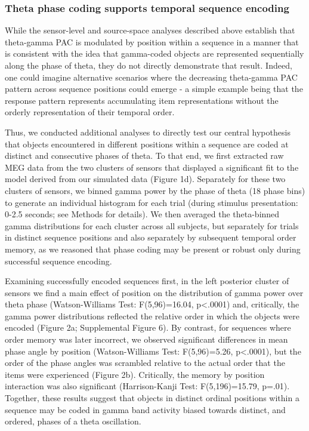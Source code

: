 \subsubsection{Theta phase coding supports temporal sequence
encoding}\label{theta-phase-coding-supports-temporal-sequence-encoding}

While the sensor-level and source-space analyses described above
establish that theta-gamma PAC is modulated by position within a
sequence in a manner that is consistent with the idea that gamma-coded
objects are represented sequentially along the phase of theta, they do
not directly demonstrate that result. Indeed, one could imagine
alternative scenarios where the decreasing theta-gamma PAC pattern
across sequence positions could emerge - a simple example being that the
response pattern represents accumulating item representations without
the orderly representation of their temporal order.

Thus, we conducted additional analyses to directly test our central
hypothesis that objects encountered in different positions within a
sequence are coded at distinct and consecutive phases of theta. To that
end, we first extracted raw MEG data from the two clusters of sensors
that displayed a significant fit to the model derived from our simulated
data (Figure 1d). Separately for these two clusters of sensors, we
binned gamma power by the phase of theta (18 phase bins) to generate an
individual histogram for each trial (during stimulus presentation: 0-2.5
seconds; see Methods for details). We then averaged the theta-binned
gamma distributions for each cluster across all subjects, but separately
for trials in distinct sequence positions and also separately by
subsequent temporal order memory, as we reasoned that phase coding may
be present or robust only during successful sequence encoding.

Examining successfully encoded sequences first, in the left posterior
cluster of sensors we find a main effect of position on the distribution
of gamma power over theta phase (Watson-Williams Test: F(5,96)=16.04,
p\textless{}.0001) and, critically, the gamma power distributions
reflected the relative order in which the objects were encoded (Figure
2a; Supplemental Figure 6). By contrast, for sequences where order
memory was later incorrect, we observed significant differences in mean
phase angle by position (Watson-Williams Test: F(5,96)=5.26,
p\textless{}.0001), but the order of the phase angles was scrambled
relative to the actual order that the items were experienced (Figure
2b). Critically, the memory by position interaction was also significant
(Harrison-Kanji Test: F(5,196)=15.79, p=.01). Together, these results
suggest that objects in distinct ordinal positions within a sequence may
be coded in gamma band activity biased towards distinct, and ordered,
phases of a theta oscillation.

